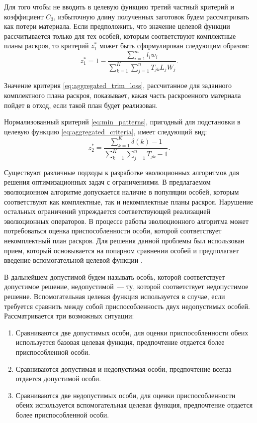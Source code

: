 \documentclass[12pt]{article}
\begin{document}
Для того чтобы не вводить в целевую функцию третий частный критерий и 
коэффициент $C_3$, избыточную длину полученных заготовок будем рассматривать
как потери материала. Если предположить, что значение целевой функции 
рассчитывается только для тех особей, которым соответствуют комплектные планы 
раскроя, то критерий $z_1^*$ может быть сформулирован следующим образом:
\begin{equation}\label{eq:aggregated_trim_loss}
    z_1^*=1-\frac{ \sum_{i=1}^{m} l_iw_i }{ \sum_{k=1}^{K} \sum_{j=1}^{n} T_{jk}L_jW_j }.
\end{equation}

Значение критерия 
\eqref{eq:aggregated_trim_loss}, 
рассчитанное для заданного комплектного плана раскроя, 
показывает, какая часть раскроенного материала пойдет в отход, если такой план 
будет реализован.

Нормализованный критерий 
\eqref{eq:min_patterns}, 
пригодный для подстановки в целевую функцию 
\eqref{eq:aggregated_criteria}, 
имеет следующий вид:
\begin{equation}\label{eq:min_patterns_normalized}
    z_2^*=\frac{ \sum_{k=1}^{K} \delta\left(k\right) - 1 }
    { \sum_{k=1}^{K} \sum_{j=1}^{n} T_{jk} - 1 }.
\end{equation}

Существуют различные подходы к разработке эволюционных алгоритмов для решения 
оптимизационных задач с ограничениями. В предлагаемом эволюционном алгоритме 
допускается наличие в популяции особей, которым соответствуют как комплектные, 
так и некомплектные планы раскроя. Нарушение остальных ограничений упреждается 
соответствующей реализацией эволюционных операторов. В процессе работы 
эволюционного алгоритма может потребоваться оценка приспособленности особи, 
которой соответствует некомплектный план раскроя. Для решения данной проблемы 
был использован прием, который основывается на попарном сравнении особей и 
предполагает введение вспомогательной целевой функции 
\cite{deb00}.

В дальнейшем допустимой будем называть особь, которой соответствует допустимое 
решение, недопустимой~--- ту, которой соответствует недопустимое решение. 
Вспомогательная целевая функция используется в случае, если требуется сравнить 
между собой приспособленность двух недопустимых особей. Рассматривается три 
возможных ситуации:
\begin{enumerate}
    \item Сравниваются две допустимых особи, для оценки приспособленности 
    обеих используется базовая целевая функция, предпочтение отдается более 
    приспособленной особи.
    \item Сравниваются допустимая и недопустимая особи, предпочтение всегда 
    отдается допустимой особи.
    \item Сравниваются две недопустимых особи, для оценки приспособленности 
    обеих используется вспомогательная целевая функция, предпочтение отдается 
    более приспособленной особи.
\end{enumerate}
\end{document}
